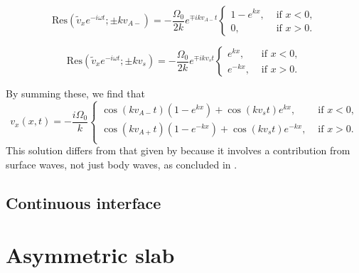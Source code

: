 \documentclass[12pt]{../style-files/ociamthesis}
\begin{document}
\begin{equation}
\mathrm{Res}(\tilde{v}_x e^{-i\omega t}; \pm kv_{A-}) = -\frac{\Omega_0}{2k} e^{\mp ikv_{A-}t}
\begin{cases}
1 - e^{kx}, & \text{ if } x<0, \\
0, & \text{ if } x>0.
\end{cases}
\end{equation}

\begin{equation}
\mathrm{Res}(\tilde{v}_x e^{-i\omega t}; \pm kv_{s}) = -\frac{\Omega_0}{2k} e^{\mp ikv_st} 
\begin{cases}
e^{kx}, & \text{ if } x<0, \\
e^{-kx}, & \text{ if } x>0.
\end{cases}
\end{equation}

By summing these, we find that
\begin{equation}
v_x(x, t) = -\frac{i\Omega_0}{k} \begin{cases}
\cos(kv_{A-}t)(1-e^{kx}) + \cos(kv_st)e^{kx}, & \text{ if } x<0, \\
\cos(kv_{A+}t)(1-e^{-kx}) + \cos(kv_st)e^{-kx}, & \text{ if } x>0. \\
\end{cases}
\end{equation}
This solution differs from that given by \cite{rae_etal81} because it involves a contribution from surface waves, not just body waves, as concluded in \cite{rae_etal81}.


\color{red}
\subsection{Continuous interface}
\section{Asymmetric slab}
\label{sec: IVP slab}
\end{document}
